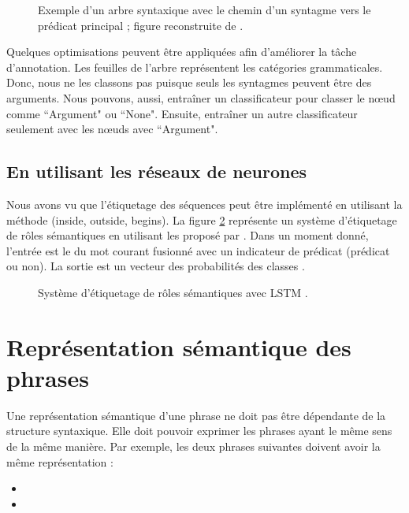 \documentclass{KodeBook}
\begin{document}
\begin{figure}[ht]
	\centering
	\caption[Exemple d'un arbre syntaxique avec le chemin vers le prédicat principal.]{Exemple d'un arbre syntaxique avec le chemin d'un syntagme vers le prédicat principal ; figure reconstruite de \cite{2019-jurafsky-martin}.}
	\label{fig:srl-arbre-chemin}
\end{figure}

Quelques optimisations peuvent être appliquées afin d'améliorer la tâche d'annotation.
Les feuilles de l'arbre représentent les catégories grammaticales. 
Donc, nous ne les classons pas puisque seuls les syntagmes peuvent être des arguments. 
Nous pouvons, aussi, entraîner un classificateur pour classer le nœud comme ``Argument" ou ``None".
Ensuite, entraîner un autre classificateur seulement avec les nœuds avec ``Argument".


\subsection{En utilisant les réseaux de neurones}

Nous avons vu que l'étiquetage des séquences peut être implémenté en utilisant la méthode   (inside, outside, begins). 
La figure \ref{fig:srl-embedding} représente un système d'étiquetage de rôles sémantiques en utilisant les  proposé par \citet{2017-he-al}. 
Dans un moment donné, l'entrée est le  du mot courant fusionné avec un indicateur de prédicat (prédicat ou non). 
La sortie est un vecteur des probabilités des classes .

\begin{figure}[ht]
	\centering
	\caption[Système d'étiquetage de rôles sémantiques avec LSTM.]{Système d'étiquetage de rôles sémantiques avec LSTM \cite{2017-he-al}.}
	\label{fig:srl-embedding}
\end{figure}

\section{Représentation sémantique des phrases}

Une représentation sémantique d'une phrase ne doit pas être dépendante de la structure syntaxique. 
Elle doit pouvoir exprimer les phrases ayant le même sens de la même manière. 
Par exemple, les deux phrases suivantes doivent avoir la même représentation :
\begin{itemize}
	\item {}
	\item {}
\end{itemize}
\end{document}
